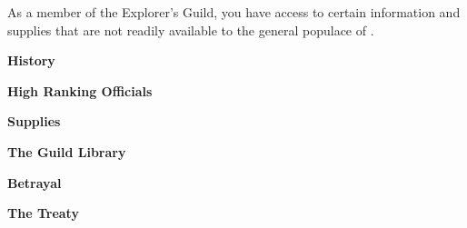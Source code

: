 \documentclass[blue]{NeptuneBall}
\begin{document}
\name{\bExplorer{}}

As a member of the Explorer's Guild, you have access to certain information and supplies that are not readily available to the general populace of \pAtlantis{}.

{\bf History}

{\bf High Ranking Officials}

{\bf Supplies}

{\bf The Guild Library}

{\bf Betrayal}

{\bf The Treaty}
\end{document}
